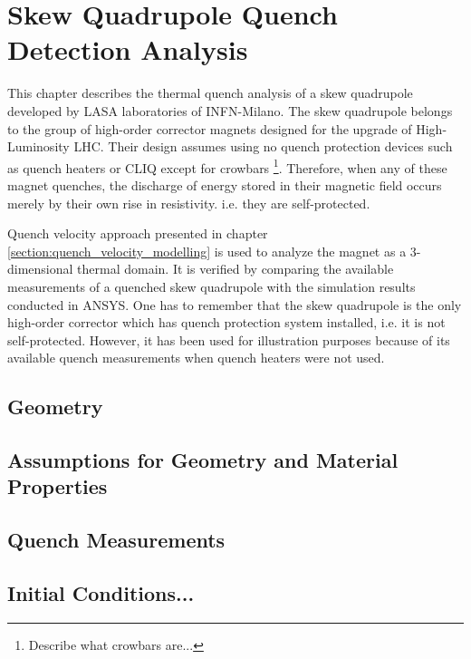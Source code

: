 \documentclass{article}
\begin{document}
\clearpage
\section{Skew Quadrupole Quench Detection Analysis}
\label{section:skew_quadrupole_quench_detection_analysis}

This chapter describes the thermal quench analysis of a skew quadrupole developed by LASA laboratories of INFN-Milano. The skew quadrupole belongs to the group of high-order corrector magnets designed for the upgrade of High-Luminosity LHC. Their design assumes using no quench protection devices such as quench heaters or CLIQ except for crowbars \footnote{Describe what crowbars are...}. Therefore, when any of these magnet quenches, the discharge of energy stored in their magnetic field occurs merely by their own rise in resistivity. i.e. they are self-protected.

Quench velocity approach presented in chapter \ref{section:quench_velocity_modelling} is used to analyze the magnet as a 3-dimensional thermal domain. It is verified by comparing the available measurements of a quenched skew quadrupole with the simulation results conducted in ANSYS. One has to remember that the skew quadrupole is the only high-order corrector which has quench protection system installed, i.e. it is not self-protected. However, it has been used for illustration purposes because of its available quench measurements when quench heaters were not used. 

\subsection{Geometry}


\subsection{Assumptions for Geometry and Material Properties}


\subsection{Quench Measurements}


\subsection{Initial Conditions...}

\end{document}
